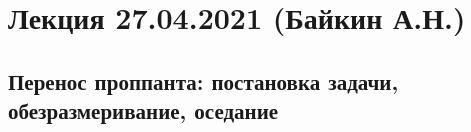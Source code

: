 \documentclass[main.tex]{subfiles}
\begin{document}

\section{Лекция 27.04.2021 (Байкин А.Н.)}

\subsection{Перенос проппанта: постановка задачи, обезразмеривание, оседание}
\end{document}
